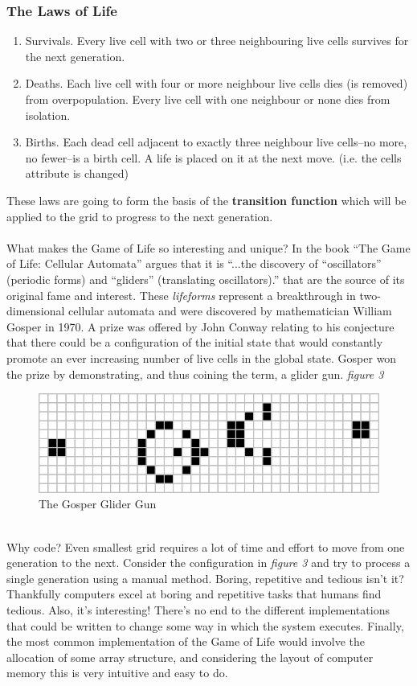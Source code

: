 \documentclass[11pt]{article} %
\begin{document}
\subsubsection*{The Laws of Life}
\begin{enumerate}
\item Survivals. Every live cell with two or three neighbouring live cells survives for the next generation.
\item Deaths. Each live cell with four or more neighbour live cells dies (is removed) from overpopulation. Every live cell with one neighbour or none dies from isolation.
\item Births. Each dead cell adjacent to exactly three neighbour live cells--no more, no fewer--is a birth cell. A life is placed on it at the next move. (i.e. the cells attribute is changed) \cite{ref7}
\end{enumerate}
These laws are going to form the basis of the {\bf transition function} which will be applied to the grid to progress to the next generation.\\
\\What makes the Game of Life so interesting and unique? In the book ``The Game of Life: Cellular Automata'' \cite[p1]{ref8} argues that it is ``...the discovery of ``oscillators'' (periodic forms) and ``gliders'' (translating oscillators).'' that are the source of its original fame and interest. These {\it lifeforms} represent a breakthrough in two-dimensional cellular automata and were discovered by mathematician William Gosper in 1970. A prize was offered by John Conway relating to his conjecture that there could be a configuration of the initial state that would constantly promote an ever increasing number of live cells in the global state. Gosper won the prize by demonstrating, and thus coining the term, a glider gun. {\it figure 3}\\
\begin{figure}[h]
\centering
\includegraphics[scale=0.5]{gosper}
\caption{The Gosper Glider Gun}
\label{fig: Gosper}
\end{figure}
\\Why code? Even smallest grid requires a lot of time and effort to move from one generation to the next. Consider the configuration in {\it figure 3} and try to process a single generation using a manual method. Boring, repetitive and tedious isn't it? Thankfully computers excel at boring and repetitive tasks that humans find tedious. Also, it's interesting! There's no end to the different implementations that could be written to change some way in which the system executes. Finally, the most common implementation of the Game of Life would involve the allocation of some array structure, and considering the layout of computer memory this is very intuitive and easy to do.\\
\end{document}
